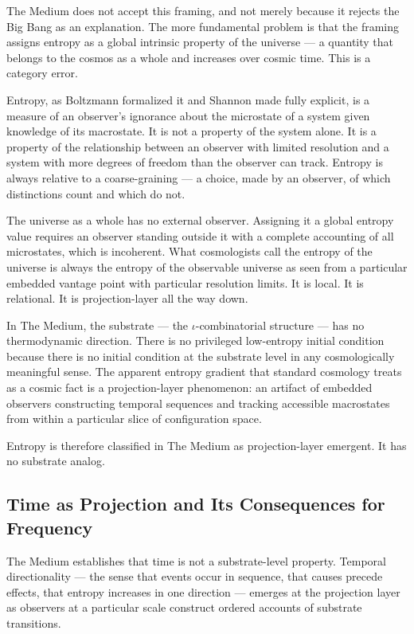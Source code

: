 \documentclass[11pt,letterpaper]{article}
\begin{document}
The Medium does not accept this framing, and not merely because it rejects the Big Bang as an explanation. The more fundamental problem is that the framing assigns entropy as a global intrinsic property of the universe --- a quantity that belongs to the cosmos as a whole and increases over cosmic time. This is a category error.

Entropy, as Boltzmann formalized it and Shannon made fully explicit, is a measure of an observer's ignorance about the microstate of a system given knowledge of its macrostate. It is not a property of the system alone. It is a property of the relationship between an observer with limited resolution and a system with more degrees of freedom than the observer can track. Entropy is always relative to a coarse-graining --- a choice, made by an observer, of which distinctions count and which do not.

The universe as a whole has no external observer. Assigning it a global entropy value requires an observer standing outside it with a complete accounting of all microstates, which is incoherent. What cosmologists call the entropy of the universe is always the entropy of the observable universe as seen from a particular embedded vantage point with particular resolution limits. It is local. It is relational. It is projection-layer all the way down.

In The Medium, the substrate --- the \(\iota\)-combinatorial structure --- has no thermodynamic direction. There is no privileged low-entropy initial condition because there is no initial condition at the substrate level in any cosmologically meaningful sense. The apparent entropy gradient that standard cosmology treats as a cosmic fact is a projection-layer phenomenon: an artifact of embedded observers constructing temporal sequences and tracking accessible macrostates from within a particular slice of configuration space.

Entropy is therefore classified in The Medium as projection-layer emergent. It has no substrate analog.
\subsection{Time as Projection and Its Consequences for Frequency}
\label{sec:org600cef9}

The Medium establishes that time is not a substrate-level property. Temporal directionality --- the sense that events occur in sequence, that causes precede effects, that entropy increases in one direction --- emerges at the projection layer as observers at a particular scale construct ordered accounts of substrate transitions.
\end{document}
